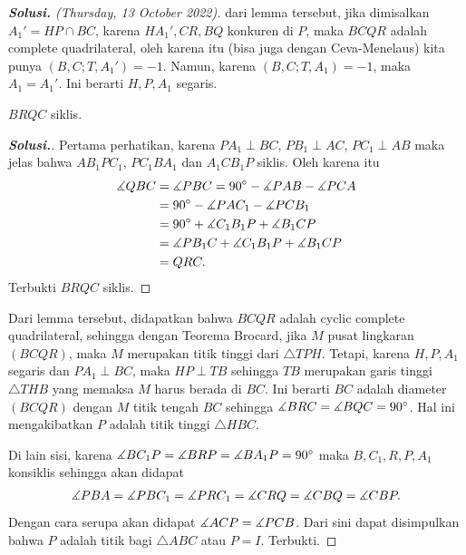 \begin{proof}[\textbf{Solusi. }(Thursday, 13 October 2022)]
dari lemma tersebut, jika dimisalkan $A_1' = HP \cap BC$, karena $HA_1', CR, BQ$ konkuren di $P$, maka $BCQR$ adalah complete quadrilateral, oleh karena itu (bisa juga dengan Ceva-Menelaus) kita punya $(B,C;T,A_1')=-1$. Namun, karena $(B,C;T,A_1)=-1$, maka $A_1=A_1'$. Ini berarti $H,P,A_1$ segaris.

\begin{lemmarev}
    $BRQC$ siklis.
    \begin{proof}[\textbf{Solusi.}] 
        Pertama perhatikan, karena $PA_1 \perp BC$, $PB_1 \perp AC$, $PC_1 \perp AB$ maka jelas bahwa $AB_1PC_1$, $PC_1BA_1$ dan $A_1CB_1P$ siklis. Oleh karena itu
        \begin{align*}
            \measuredangle QBC &= \measuredangle PBC = 90^\circ - \measuredangle PAB - \measuredangle PCA\\
            &= 90^\circ - \measuredangle PAC_1 - \measuredangle PCB_1 \\
            &= 90^\circ + \measuredangle C_1B_1P + \measuredangle B_1CP \\
            &= \measuredangle PB_1C + \measuredangle C_1B_1P + \measuredangle B_1CP \\
            &= QRC.
        \end{align*}
        Terbukti $BRQC$ siklis.
    \end{proof}
\end{lemmarev}

Dari lemma tersebut, didapatkan bahwa $BCQR$ adalah cyclic complete quadrilateral, sehingga dengan Teorema Brocard, jika $M$ pusat lingkaran $(BCQR)$, maka $M$ merupakan titik tinggi dari $\triangle TPH$. Tetapi, karena $H,P,A_1$ segaris dan $PA_1 \perp BC$, maka $HP \perp TB$ sehingga $TB$ merupakan garis tinggi $\triangle THB$ yang memaksa $M$ harus berada di $BC$. Ini berarti $BC$ adalah diameter $(BCQR)$ dengan $M$ titik tengah $BC$ sehingga $\measuredangle BRC = \measuredangle BQC = 90^\circ$. Hal ini mengakibatkan $P$ adalah titik tinggi $\triangle HBC$.

Di lain sisi, karena $\measuredangle BC_1P = \measuredangle BRP = \measuredangle BA_1P = 90^\circ$ maka $B,C_1,R,P,A_1$ konsiklis sehingga akan didapat
\begin{align*}
    \measuredangle PBA = \measuredangle PBC_1 = \measuredangle PRC_1 = \measuredangle CRQ = \measuredangle CBQ = \measuredangle CBP.
\end{align*}
Dengan cara serupa akan didapat $\measuredangle ACP = \measuredangle PCB$. Dari sini dapat disimpulkan bahwa $P$ adalah titik bagi $\triangle ABC$ atau $P=I$. Terbukti.


\end{proof}